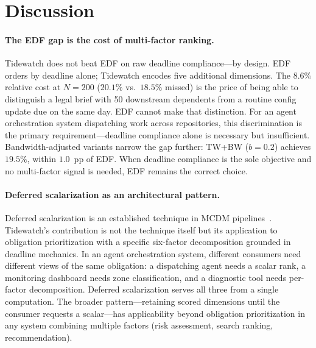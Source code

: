 \documentclass[11pt]{article}
\begin{document}
\section{Discussion}
\label{sec:discussion}

\paragraph{The EDF gap is the cost of multi-factor ranking.}
Tidewatch does not beat EDF on raw deadline compliance---by design.
EDF orders by deadline alone; Tidewatch encodes five additional
dimensions.  The $8.6\%$ relative cost at $N{=}200$ ($20.1\%$ vs.\
$18.5\%$ missed) is the price of being able to distinguish a legal
brief with 50 downstream dependents from a routine config update
due on the same day.  EDF cannot make that distinction.  For an
agent orchestration system dispatching work across repositories,
this discrimination is the primary requirement---deadline compliance
alone is necessary but insufficient.  Bandwidth-adjusted variants
narrow the gap further: TW+BW ($b{=}0.2$) achieves $19.5\%$,
within $1.0$~pp of EDF.  When deadline compliance is the sole
objective and no multi-factor signal is needed, EDF remains the
correct choice.

\paragraph{Deferred scalarization as an architectural pattern.}
Deferred scalarization is an established technique in MCDM
pipelines~\citep{hwang1981topsis}.  Tidewatch's contribution is
not the technique itself but its application to obligation
prioritization with a specific six-factor decomposition grounded in
deadline mechanics.  In an agent orchestration system, different
consumers need different views of the same obligation: a dispatching
agent needs a scalar rank, a monitoring dashboard needs zone
classification, and a diagnostic tool needs per-factor decomposition.
Deferred scalarization serves all three from a single computation.
The broader pattern---retaining scored dimensions until the consumer
requests a scalar---has applicability beyond obligation
prioritization in any system combining multiple factors (risk
assessment, search ranking, recommendation).
\end{document}
